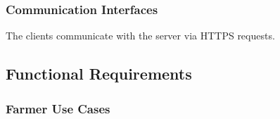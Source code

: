 \documentclass{article}
\begin{document}
\subsubsection{Communication Interfaces}
The clients communicate with the server via HTTPS requests.


\newpage





\subsection{Functional Requirements}

\subsubsection{Farmer Use Cases}
\end{document}
